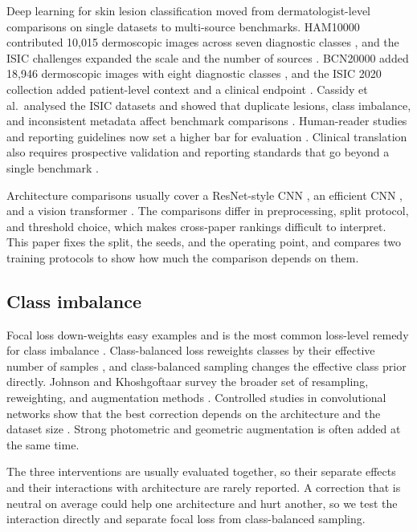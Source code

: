 \documentclass[11pt]{article}
\begin{document}
Deep learning for skin lesion classification moved from dermatologist-level comparisons on single datasets \citep{esteva2017dermatologist} to multi-source benchmarks. HAM10000 contributed 10,015 dermoscopic images across seven diagnostic classes \citep{tschandl2018ham10000}, and the ISIC challenges expanded the scale and the number of sources \citep{codella2018isic}. BCN20000 added 18,946 dermoscopic images with eight diagnostic classes \citep{combalia2019bcn20000}, and the ISIC 2020 collection added patient-level context and a clinical endpoint \citep{rotemberg2021isic}. Cassidy et al.\ analysed the ISIC datasets and showed that duplicate lesions, class imbalance, and inconsistent metadata affect benchmark comparisons \citep{cassidy2022isic}. Human-reader studies and reporting guidelines now set a higher bar for evaluation \citep{tschandl2019human,daneshjou2022clear}. Clinical translation also requires prospective validation and reporting standards that go beyond a single benchmark \citep{rajpurkar2022ai}.

Architecture comparisons usually cover a ResNet-style CNN \citep{he2016resnet}, an efficient CNN \citep{tan2019efficientnet}, and a vision transformer \citep{dosovitskiy2021vit}. The comparisons differ in preprocessing, split protocol, and threshold choice, which makes cross-paper rankings difficult to interpret. This paper fixes the split, the seeds, and the operating point, and compares two training protocols to show how much the comparison depends on them.

\subsection{Class imbalance}

Focal loss down-weights easy examples and is the most common loss-level remedy for class imbalance \citep{lin2017focal}. Class-balanced loss reweights classes by their effective number of samples \citep{cui2019classbalanced}, and class-balanced sampling changes the effective class prior directly. Johnson and Khoshgoftaar survey the broader set of resampling, reweighting, and augmentation methods \citep{johnson2019imbalance}. Controlled studies in convolutional networks show that the best correction depends on the architecture and the dataset size \citep{buda2018systematic}. Strong photometric and geometric augmentation is often added at the same time.

The three interventions are usually evaluated together, so their separate effects and their interactions with architecture are rarely reported. A correction that is neutral on average could help one architecture and hurt another, so we test the interaction directly and separate focal loss from class-balanced sampling.
\end{document}

